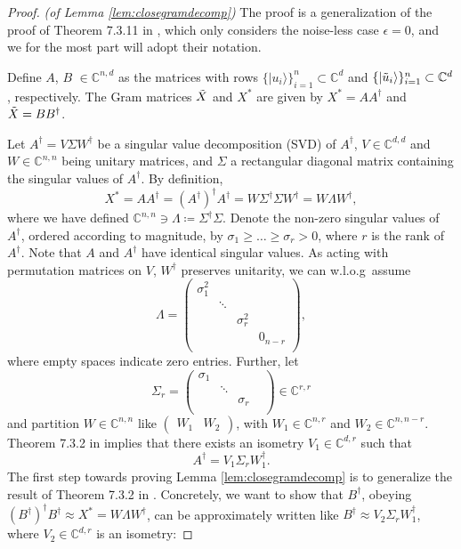 \begin{proof}\emph{(of Lemma \ref{lem:closegramdecomp})}\hfill\break
The proof is a generalization of the proof of Theorem 7.3.11 in \cite{Horn2013}, which only considers the noise-less case $\epsilon=0$, and we for the most part will adopt their notation. 

Define $A$, $B$ $\in\mathbb{C}^{n,d}$ as the matrices with rows $\{\vert u_i\rangle\}_{i=1}^n\subset\mathbb{C}^{d}$ and $\{\vert \Tilde{u}_i \rangle\}_{i=1}^n\subset\mathbb{C}^{d}$, respectively. The Gram matrices $\Tilde{X}$ and $X^*$ are given by $X^*=AA^{\dag}$ and $\Tilde{X}=BB^{\dag}$. 

Let $A^\dag = V\Sigma W^\dag$ be a singular value decomposition (SVD) of $A^\dag$, $V\in\mathbb{C}^{d,d}$ and $W\in\mathbb{C}^{n,n}$ being unitary matrices, and $\Sigma$ a rectangular diagonal matrix containing the singular values of $A^\dag$. By definition, 
\begin{equation*}
X^*=AA^\dag=(A^\dag)^{\dag} A^{\dag} = W\Sigma^\dag\Sigma W^\dag = W\Lambda W^\dag,
\end{equation*} where we have defined $\mathbb{C}^{n,n}\ni\Lambda\coloneqq\Sigma^\dag\Sigma$. Denote the non-zero singular values of $A^\dag$, ordered according to magnitude, by $\sigma_1 \geq \dots \geq \sigma_r > 0$, where $r$ is the rank of $A^\dag$. Note that $A$ and $A^{\dag}$ have identical singular values. As acting with permutation matrices on $V$, $W^{\dag}$ preserves unitarity, we can w.l.o.g\ assume
\begin{equation*}
\Lambda = 
\begin{pmatrix}
\sigma_1^2 & & & \\
& \ddots & & \\
& & \sigma_r^2 & \\
& & & 0_{n-r}\\
\end{pmatrix},
\end{equation*}
where empty spaces indicate zero entries.
Further, let
\begin{equation*}
\Sigma_r = 
\begin{pmatrix}
\sigma_1 & &\\
& \ddots & & \\
& & \sigma_r\\
\end{pmatrix}\in\mathbb{C}^{r,r}
\end{equation*} and partition $W\in\mathbb{C}^{n,n}$ like 
$\begin{pmatrix}
W_1 & W_2
\end{pmatrix}$, with $W_1\in\mathbb{C}^{n,r}$ and $W_2\in\mathbb{C}^{n,n-r}$. Theorem 7.3.2 in \cite{Horn2013} implies that there exists an isometry $V_1\in\mathbb{C}^{d,r}$ such that 
\begin{equation*}
A^{\dag}=V_1\Sigma_r W_1^{\dag}.
\end{equation*}
The first step towards proving Lemma \ref{lem:closegramdecomp} is to generalize the result of Theorem 7.3.2 in \cite{Horn2013}. Concretely, we want to show that $B^{\dag}$, obeying $(B^{\dag})^{\dag}B^{\dag}\approx X^* = W\Lambda W^{\dag}$, can be approximately written like $B^{\dag}\approx V_2\Sigma_rW_1^{\dag}$, where $V_2\in\mathbb{C}^{d,r}$ is an isometry:


\end{proof}
